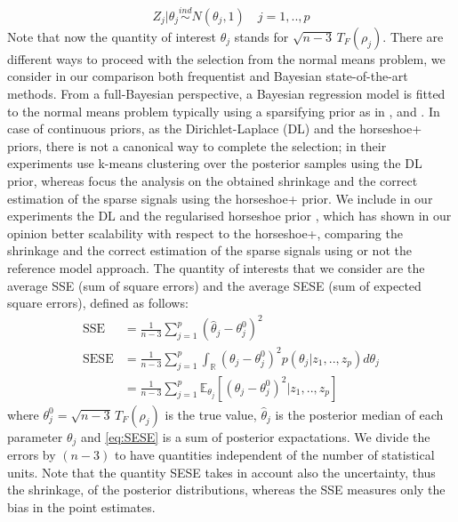 \documentclass[american,]{article}
\theoremstyle{definition}
\begin{document}
\
\begin{equation} \label{eq:normal_means_problem2}
Z_{j}|\theta_{j}\overset{ind}{\sim}N(\theta_{j},1) \quad j=1,..,p
\end{equation}
Note that now the quantity of interest $\theta_{j}$ stands for $\sqrt{n-3}\,T_{F}(\rho_{j})$. There are different ways to proceed with the selection from the normal means problem, we consider in our comparison both frequentist and Bayesian state-of-the-art methods. From a full-Bayesian perspective, a Bayesian regression model is fitted to the normal means problem typically using a sparsifying prior as in \cite{paper:dirichlet_laplace}, \cite{paper:horseshoe+} and \cite{paper:EBmed}. In case of continuous priors, as the Dirichlet-Laplace (DL) and the horseshoe+ priors, there is not a canonical way to complete the selection; in their experiments \cite{paper:dirichlet_laplace} use k-means clustering over the posterior samples using the DL prior, whereas \cite{paper:horseshoe+} focus the analysis on the obtained shrinkage and the correct estimation of the sparse signals using the horseshoe+ prior. We include in our experiments the DL and the regularised horseshoe prior \citep{paper:rhs}, which has shown in our opinion better scalability with respect to the horseshoe+, comparing the shrinkage and the correct estimation of the sparse signals using or not the reference model approach. The quantity of interests that we consider are the average SSE (sum of square errors) and the average SESE (sum of expected square errors), defined as follows:
\
\begin{align}
\text{SSE}&=\frac{1}{n-3}\sum_{j=1}^{p}(\hat{\theta}_{j} - \theta^{0}_{j})^{2} \label{eq:SSE} \\
\text{SESE}&=\frac{1}{n-3}\sum_{j=1}^{p}\int_{\mathbb{R}}(\theta_{j}-\theta^{0}_{j})^{2}p(\theta_{j}|z_{1},..,z_{p})d\theta_{j} \\
&=\frac{1}{n-3}\sum_{j=1}^{p}\mathbb{E}_{\theta_{j}}[(\theta_{j}-\theta^{0}_{j})^{2}|z_{1},..,z_{p}] \label{eq:SESE}
\end{align}
where $\theta_{j}^{0}=\sqrt{n-3}\,T_{F}(\rho_{j})$ is the true value, $\hat{\theta}_{j}$ is the posterior median of each parameter $\theta_{j}$ and \eqref{eq:SESE} is a sum of posterior expactations. We divide the errors by $(n-3)$ to have quantities independent of the number of statistical units. Note that the quantity SESE takes in account also the uncertainty, thus the shrinkage, of the posterior distributions, whereas the SSE measures only the bias in the point estimates. 
\end{document}
